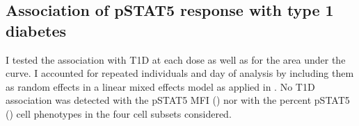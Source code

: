 



\subsection{Association of pSTAT5 response with type 1 diabetes}

I tested the association with T1D at each dose as well as for the area under the curve.
I accounted for repeated individuals and day of analysis by including them as random effects in a linear mixed effects model as applied in .
No T1D association was detected with the pSTAT5 MFI 
()
nor with the percent pSTAT5\positive
()
cell phenotypes in the four cell subsets considered.

